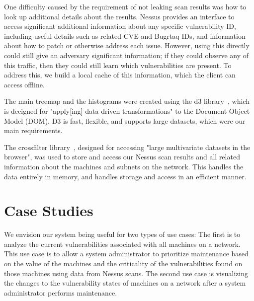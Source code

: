 \documentclass{acm_proc_article-sp}
\begin{document}
One difficulty caused by the requirement of not leaking scan results was how to look up additional details about the results.
Nessus provides an interface to access significant additional information about any specific vulnerability ID, including useful details such as related CVE and Bugrtaq IDs, and information about how to patch or otherwise address each issue.
However, using this directly could still give an adversary significant information; if they could observe any of this traffic, then they could still learn which vulnerabilities are present.
To address this, we build a local cache of this information, which the client can access offline.

The main treemap and the histograms were created using the d3 library~\cite{d3}, which is decigned for "apply[ing] data-driven transformations" to the Document Object Model (DOM).
 D3 is fast, flexible, and supports large datasets, which were our main requirements.

The crossfilter library~\cite{crossfilter}, designed for accessing "large multivariate datasets in the browser", was used to store and access our Nessus scan results and all related information about the machines and subnets on the network.
This handles the data entirely in memory, and handles storage and access in an efficient manner.


\section{Case Studies}
We envision our system being useful for two types of use cases: The first is to
analyze the current vulnerabilities associated with all machines on a network.
This use case is to allow a system administrator to prioritize maintenance based
on the value of the machines and the criticality of the vulnerabilities found on
those machines using data from Nessus scans. The second use case is visualizing 
the changes to the vulnerability states of machines on a network after a system
administrator performs maintenance.
\end{document}
